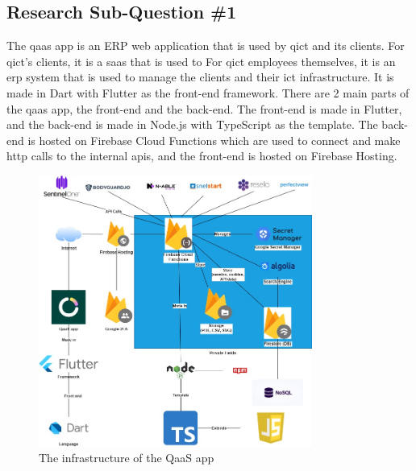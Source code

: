 \begin{multicols}{2}
      \section{Research Sub-Question \#1}
      The \acrshort{qaas} app is an \gls{ERP} web application that is used by \acrshort{qict} and its clients.
      For \acrshort{qict}'s clients, it is a \acrshort{saas} that is used to
      For \acrshort{qict} employees themselves, it is an
      \acrshort{erp} system that is used to manage the clients and their \acrshort{ict} infrastructure.
      It is made in Dart with Flutter as the front-end framework. There are 2 main parts of the \acrshort{qaas} app, the
      front-end and the back-end. The front-end is made in Flutter, and the back-end is made in Node.js with TypeScript
      as the template. The back-end is hosted on Firebase Cloud Functions which are used to connect and make
      \acrshort{http} calls to the internal \acrshort{api}s, and the front-end is hosted on Firebase Hosting.
\end{multicols}

\begin{figure}[htbp]
      \centering
      \includegraphics[width=0.8\textwidth]{Figures/QaaS App Infraastructure.jpg}
      \caption{The infrastructure of the QaaS app}
\end{figure}

